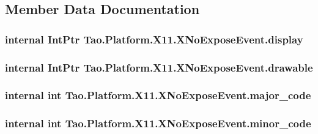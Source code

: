 \subsection{Member Data Documentation}
\hypertarget{struct_tao_1_1_platform_1_1_x11_1_1_x_no_expose_event_a5092fdfef54b3c792bcb97c3c893130f}{
\subsubsection[{display}]{\setlength{\rightskip}{0pt plus 5cm}internal IntPtr {\bf Tao.Platform.X11.XNoExposeEvent.display}}}
\label{struct_tao_1_1_platform_1_1_x11_1_1_x_no_expose_event_a5092fdfef54b3c792bcb97c3c893130f}
\hypertarget{struct_tao_1_1_platform_1_1_x11_1_1_x_no_expose_event_a01cf958486a0894186377e2e57673010}{
\subsubsection[{drawable}]{\setlength{\rightskip}{0pt plus 5cm}internal IntPtr {\bf Tao.Platform.X11.XNoExposeEvent.drawable}}}
\label{struct_tao_1_1_platform_1_1_x11_1_1_x_no_expose_event_a01cf958486a0894186377e2e57673010}
\hypertarget{struct_tao_1_1_platform_1_1_x11_1_1_x_no_expose_event_a1b644e345a353c6f1ba8db995854071e}{
\subsubsection[{major\_\-code}]{\setlength{\rightskip}{0pt plus 5cm}internal int {\bf Tao.Platform.X11.XNoExposeEvent.major\_\-code}}}
\label{struct_tao_1_1_platform_1_1_x11_1_1_x_no_expose_event_a1b644e345a353c6f1ba8db995854071e}
\hypertarget{struct_tao_1_1_platform_1_1_x11_1_1_x_no_expose_event_a4aafa728ba5bec496e2479bf52d6ab95}{
\subsubsection[{minor\_\-code}]{\setlength{\rightskip}{0pt plus 5cm}internal int {\bf Tao.Platform.X11.XNoExposeEvent.minor\_\-code}}}
